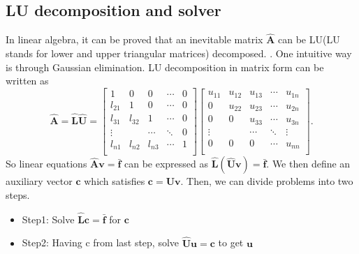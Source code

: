 \documentclass[12pt]{article}
\begin{document}
\subsection{LU decomposition and solver}
In linear algebra, it can be proved that an inevitable matrix $\mathbf{\hat{A}}$ can be LU(LU stands for lower and upper triangular matrices) decomposed. \cite{sauer2012numerical,golub2012matrix}. One intuitive way is through Gaussian elimination. LU decomposition in matrix form can be written as 
\[   
\mathbf{\hat{A}}=\mathbf{\hat{L}\hat{U}}=\left[\begin{array}{ccccc}   
    1 &    0    & 0   & \cdots    & 0\\  
    l_{21} &    1    & 0        & \cdots  & 0\\
    l_{31} &    l_{32}   &1        & \cdots  & 0\\ 
    \vdots      &\    & \cdots    & \ddots  & 0\\ 
    l_{n1} &     l_{n2}    &  l_{n3}  &\cdots   & 1\\ 
\end{array}\right]
\left[\begin{array}{ccccc}   
    u_{11} &    u_{12}    & u_{13}   & \cdots    & u_{1n}\\  
    0 &    u_{22}    &u_{23}        & \cdots  & u_{2n}\\
    0 &    0   &u_{33}        & \cdots  & u_{3n}\\ 
    \vdots      &\    & \cdots    & \ddots  & \vdots\\ 
    0 &     0    &  0  &\cdots   & u_{nn}\\ 
\end{array}\right].
\] 
So linear equations $\mathbf{\hat{A}v = \bar{f}}$ can be expressed as $\mathbf{\hat{L}(\hat{U}v) = \bar{f}}$. We then define an auxiliary vector $\mathbf{c}$ which satisfies $\mathbf{c = Uv}$. Then, we can divide problems into two steps.
\begin{itemize}
\item Step1: Solve $\mathbf{\hat{L}c = \bar{f}}$ for $\mathbf{c}$
\item Step2: Having c from last step, solve $\mathbf{\hat{U}u = c}$ to get $\mathbf{u}$
\end{itemize}
\end{document}
